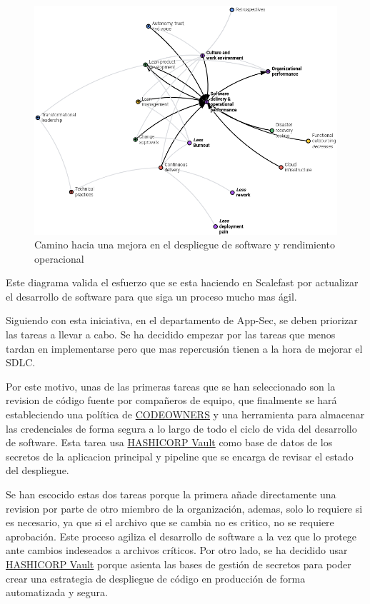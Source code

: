 \documentclass[12pt]{report} %
\begin{document}
\begin{figure}[H]
  \includegraphics[width=\textwidth]{DORA-SDOP}
  \caption{Camino hacia una mejora en el despliegue de software y rendimiento
  operacional}
  \label{fig:DORA-SDOP}
\end{figure}

Este diagrama valida el esfuerzo que se esta haciendo en Scalefast por actualizar
el desarrollo de software para que siga un proceso mucho mas ágil.

Siguiendo con esta iniciativa, en el departamento de \gls{App-Sec}, se deben
priorizar las tareas a llevar a cabo.
Se ha decidido empezar por las tareas que menos tardan en implementarse pero que
mas repercusión tienen a la hora de mejorar el \gls{SDLC}.

Por este motivo, unas de las primeras tareas que se han seleccionado son la
revision de código fuente por compañeros de equipo, que finalmente se hará
estableciendo una política de 
\href{https://docs.gitlab.com/ee/user/project/code_owners.html}{CODEOWNERS} y
una herramienta para almacenar las credenciales de forma segura a lo largo de
todo el ciclo de vida del desarrollo de software.
Esta tarea usa \href{https://www.hashicorp.com/products/vault}{HASHICORP Vault}
como base de datos de los secretos de la aplicacion principal y pipeline que se
encarga de revisar el estado del despliegue.

Se han escocido estas dos tareas porque la primera añade directamente una
revision por parte de otro miembro de la organización, ademas, solo lo requiere
si es necesario, ya que si el archivo que se cambia no es critico, no se
requiere aprobación. Este proceso agiliza el desarrollo de software a la vez que
lo protege ante cambios indeseados a archivos críticos.
Por otro lado, se ha decidido usar
\href{https://www.hashicorp.com/products/vault}{HASHICORP Vault} 
porque asienta las bases de gestión de secretos para poder crear una estrategia
de despliegue de código en producción de forma automatizada y segura.
\end{document}
